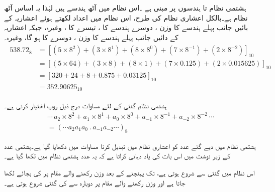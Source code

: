 	ہشتمی نظام   تا    ہندسوں پر مبنی ہے ۔اس  نظام میں آٹھ ہندسے ہیں لہٰذا  یہ اساس آٹھ   نظام ہے۔بالکل اعشاری نظام کی طرح، اس نظام میں اعداد لکھتے ہوئے اعشاریہ کے بائیں جانب پہلے ہندسے  کا وزن  ، دوسرے ہندسے کا   ، تیسرے کا ،   وغیرہ، جبکہ اعشاریہ کے دائیں جانب پہلے  ہندسے کا وزن ، دوسرے    کا     ہو گا، وغیرہ۔
\begin{gather}
\begin{aligned}\label{مساوات_ثنائی_آٹھ}
538.72_8&=[(5\times 8^2)+(3\times 8^1)+(8\times8^0)+(7\times 8^{-1})+(2\times 8^{-2})]_{10}\\
&=[(5\times 64)+(3\times 8)+(8\times 1)+(7\times 0.125)+(2\times 0.015625)]_{10}\\
&=[320+24+8+0.875+0.03125]_{10}\\
&=352.90625_{10}
\end{aligned}
\end{gather}

	 ہشتمی نظامِ گنتی کے لئے مساوات       درج ذیل روپ اختیار کرتی ہے۔
\begin{multline}
\cdots\, a_2\times 8^2+a_1\times 8^1+a_0\times 8^0+a_{-1}\times 8^{-1}+a_{-2}\times 8^{-2}\,\cdots\\
=(\cdots a_2a_1a_0\ . \,a_{-1}a_{-2}\cdots)_{8}
\end{multline}

	 ہشتمی نظام میں دیے گئے عدد کو اعشاری نظام میں تبدیل کرنا  مساوات    میں دکھایا گیا ہے۔ہشتمی عدد کے زیر نوشت  میں   اس بات کی یاد دہانی کراتا ہے کہ یہ عدد ہشتمی نظام میں لکھا گیا ہے۔ 
	 
	اس نظام میں گنتی   سے شروع ہوتی ہے،   تک پہنچنے کے  بعد    وزن رکھنے والے مقام پر    کی بجائے     لکھا جاتا ہے اور   وزن رکھنے والے مقام پر دوبارہ   سے     کی  گنتی شروع ہوتی ہے۔


